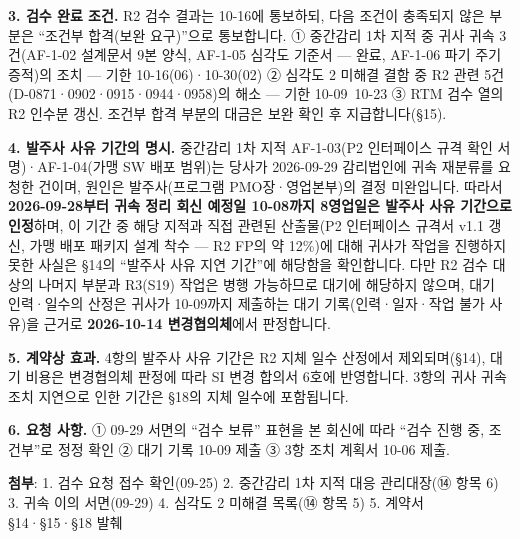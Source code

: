 \documentclass[10pt,a4paper]{article}
\begin{document}
\begin{fieldbox}
\textbf{3. 검수 완료 조건.} R2 검수 결과는 10-16에 통보하되, 다음 조건이 충족되지 않은 부분은 “조건부 합격(보완 요구)”으로 통보합니다. ① 중간감리 1차 지적 중 귀사 귀속 3건(AF-1-02 설계문서 9본 양식, AF-1-05 심각도 기준서 — 완료, AF-1-06 파기 주기 증적)의 조치 — 기한 10-16(06)·10-30(02) ② 심각도 2 미해결 결함 중 R2 관련 5건(D-0871·0902·0915·0944·0958)의 해소 — 기한 10-09~10-23 ③ RTM 검수 열의 R2 인수분 갱신. 조건부 합격 부분의 대금은 보완 확인 후 지급합니다(§15).\par
\textbf{4. 발주사 사유 기간의 명시.} 중간감리 1차 지적 AF-1-03(P2 인터페이스 규격 확인 서명)·AF-1-04(가맹 SW 배포 범위)는 당사가 2026-09-29 감리법인에 귀속 재분류를 요청한 건이며, 원인은 발주사(프로그램 PMO장·영업본부)의 결정 미완입니다. 따라서 \textbf{2026-09-28부터 귀속 정리 회신 예정일 10-08까지 8영업일은 발주사 사유 기간으로 인정}하며, 이 기간 중 해당 지적과 직접 관련된 산출물(P2 인터페이스 규격서 v1.1 갱신, 가맹 배포 패키지 설계 착수 — R2 FP의 약 12\%)에 대해 귀사가 작업을 진행하지 못한 사실은 §14의 “발주사 사유 지연 기간”에 해당함을 확인합니다. 다만 R2 검수 대상의 나머지 부분과 R3(S19) 작업은 병행 가능하므로 대기에 해당하지 않으며, 대기 인력·일수의 산정은 귀사가 10-09까지 제출하는 대기 기록(인력·일자·작업 불가 사유)을 근거로 \textbf{2026-10-14 변경협의체}에서 판정합니다.\par
\textbf{5. 계약상 효과.} 4항의 발주사 사유 기간은 R2 지체 일수 산정에서 제외되며(§14), 대기 비용은 변경협의체 판정에 따라 SI 변경 합의서 6호에 반영합니다. 3항의 귀사 귀속 조치 지연으로 인한 기간은 §18의 지체 일수에 포함됩니다.\par
\textbf{6. 요청 사항.} ① 09-29 서면의 “검수 보류” 표현을 본 회신에 따라 “검수 진행 중, 조건부”로 정정 확인 ② 대기 기록 10-09 제출 ③ 3항 조치 계획서 10-06 제출.\par
\textbf{첨부}: 1. 검수 요청 접수 확인(09-25) 2. 중간감리 1차 지적 대응 관리대장(⑭ 항목 6) 3. 귀속 이의 서면(09-29) 4. 심각도 2 미해결 목록(⑭ 항목 5) 5. 계약서 §14·§15·§18 발췌\par
\fi
\end{fieldbox}
\end{document}
